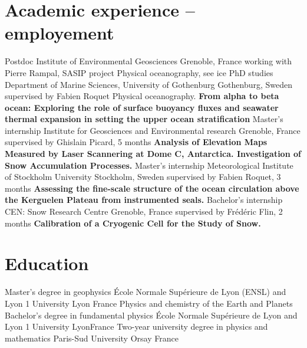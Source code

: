 \documentclass[11pt,a4paper,roman]{moderncv}
\begin{document}
\makecvtitle

\vspace*{0.5cm}

\section{Academic experience -- employement}
        {Postdoc}
        {Institute of Environmental Geosciences}
        {Grenoble, France}
        {working with Pierre Rampal, SASIP project}
        {Physical oceanography, see ice}
        {PhD studies}
        {Department of Marine Sciences, University of Gothenburg}
        {Gothenburg, Sweden}
        {supervised by Fabien Roquet}
        {Physical oceanography.
          \textbf{From alpha to beta ocean: Exploring the role of surface buoyancy fluxes and seawater thermal expansion in setting the upper ocean stratification}
        }
        {Master's internship}
        {Institute for Geosciences and Environmental research}
        {Grenoble, France}
        {supervised by Ghislain Picard, 5 months}
        {\textbf{Analysis of Elevation Maps Measured by Laser Scannering at
            Dome C, Antarctica. Investigation of Snow Accumulation Processes.}}
        {Master's internship}
        {Meteorological Institute of Stockholm University}
        {Stockholm, Sweden}
        {supervised by Fabien Roquet, 3 months}
        {\textbf{Assessing the fine-scale structure of the ocean
            circulation above the Kerguelen Plateau from instrumented seals.}}
        {Bachelor's internship}
        {CEN: Snow Research Centre}
        {Grenoble, France}
        {supervised by Frédéric Flin, 2 months}
        {\textbf{Calibration of a Cryogenic Cell for the Study of Snow.}}



\section{Education}
        {Master's degree in geophysics}
        {École Normale Supérieure de Lyon (ENSL) and Lyon 1 University}
        {Lyon}
        {France}
        {Physics and chemistry of the Earth and Planets}
        {Bachelor's degree in fundamental physics}
        {École Normale Supérieure de Lyon and Lyon 1 University}
        {Lyon}{France}{}
        {Two-year university degree in physics and mathematics}
        {Paris-Sud University}
        {Orsay}
        {France}
        {}
\end{document}

